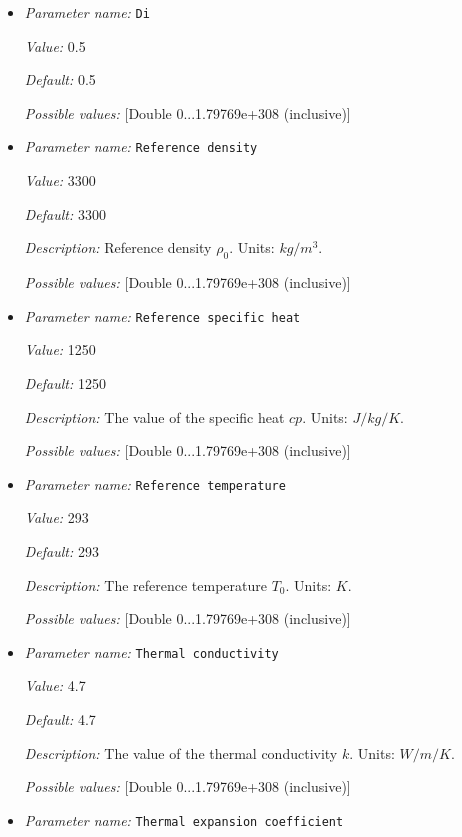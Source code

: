 \begin{itemize}
\item {\it Parameter name:} {\tt Di}


{\it Value:} 0.5


{\it Default:} 0.5


{\it Possible values:} [Double 0...1.79769e+308 (inclusive)]
\item {\it Parameter name:} {\tt Reference density}


{\it Value:} 3300


{\it Default:} 3300


{\it Description:} Reference density $\rho_0$. Units: $kg/m^3$.


{\it Possible values:} [Double 0...1.79769e+308 (inclusive)]
\item {\it Parameter name:} {\tt Reference specific heat}


{\it Value:} 1250


{\it Default:} 1250


{\it Description:} The value of the specific heat $cp$. Units: $J/kg/K$.


{\it Possible values:} [Double 0...1.79769e+308 (inclusive)]
\item {\it Parameter name:} {\tt Reference temperature}


{\it Value:} 293


{\it Default:} 293


{\it Description:} The reference temperature $T_0$. Units: $K$.


{\it Possible values:} [Double 0...1.79769e+308 (inclusive)]
\item {\it Parameter name:} {\tt Thermal conductivity}


{\it Value:} 4.7


{\it Default:} 4.7


{\it Description:} The value of the thermal conductivity $k$. Units: $W/m/K$.


{\it Possible values:} [Double 0...1.79769e+308 (inclusive)]
\item {\it Parameter name:} {\tt Thermal expansion coefficient}



\end{itemize}

